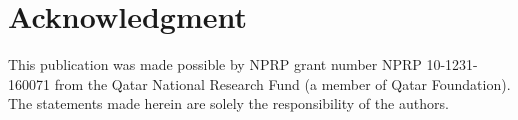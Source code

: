 \documentclass[journal,comsoc]{IEEEtran}
\begin{document}
%
\section*{Acknowledgment}
%
This publication was made possible by NPRP grant number NPRP 10-1231-160071 from the Qatar National Research Fund (a member of Qatar Foundation). The statements made herein are solely the responsibility of the authors.


\ifCLASSOPTIONcaptionsoff
  \newpage
\fi





%
%
%

% 

\end{document}
